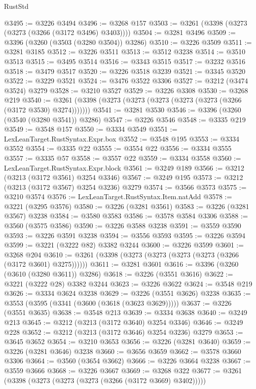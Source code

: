 \begin{lexlean}{RustStd}
\begin{coremodule}
@3495 := @3226 @3494
@3496 := @3268 @157
@3503 := @3261 (@3398 (@3273 (@3273 (@3266 (@3172 @3496) @3403))))
@3504 := @3281 @3496
@3509 := @3396 (@3260 (@3503 (@3280 @3504)) @3286)
@3510 := @3226 @3509
@3511 := @3281 @3185
@3512 := @3226 @3511
@3513 := @3512 @3238
@3514 := @3510 @3513
@3515 := @3495 @3514
@3516 := @3343 @3515
@3517 := @3232 @3516
@3518 := @3479 @3517
@3520 := @3226 @3518 @3239
@3521 := @3345 @3520
@3522 := @3229 @3521
@3524 := @3476 @3522 @3306
@3527 := @3212 (@3474 @3524) @3279
@3528 := @3210 @3527
@3529 := @3226 @3308
@3530 := @3268 @219
@3540 := @3261 (@3398 (@3273 (@3273 (@3273 (@3273 (@3273 (@3266 (@3172 @3530) @3274)))))))
@3541 := @3281 @3530
@3546 := @3396 (@3260 (@3540 (@3280 @3541)) @3286)
@3547 := @3226 @3546
@3548 := @3335 @219
@3549 := @3548 @157
@3550 := @3334 @3549
@3551 := LexLeanTarget.RustSyntax.Expr.box
@3552 := @3548 @195
@3553 := @3334 @3552
@3554 := @3335 @22
@3555 := @3554 @22
@3556 := @3334 @3555
@3557 := @3335 @57
@3558 := @3557 @22
@3559 := @3334 @3558
@3560 := LexLeanTarget.RustSyntax.Expr.block
@3561 := @3249 @189
@3566 := @3212 (@3213 (@3172 @3561) @3254 @3346)
@3567 := @3249 @195
@3573 := @3212 (@3213 (@3172 @3567) @3254 @3236) @3279
@3574 := @3566 @3573
@3575 := @3210 @3574
@3576 := LexLeanTarget.RustSyntax.Item.natAdd
@3578 := @3221 (@3295 @3576)
@3580 := @3226 (@3281 @3561)
@3583 := @3226 (@3281 @3567) @3238
@3584 := @3580 @3583
@3586 := @3578 @3584 @3306
@3588 := @3560 (@3575 @3586)
@3590 := @3226 @3588 @3238
@3591 := @3559 @3590
@3593 := @3226 @3591 @3238
@3594 := @3556 @3593
@3595 := @3226 @3594
@3599 := @3221 (@3222 @82) @3382 @3244
@3600 := @3226 @3599
@3601 := @3268 @204
@3610 := @3261 (@3398 (@3273 (@3273 (@3273 (@3273 (@3266 (@3172 @3601) @3275))))))
@3611 := @3281 @3601
@3616 := @3396 (@3260 (@3610 (@3280 @3611)) @3286)
@3618 := @3226 (@3551 @3616)
@3622 := @3221 (@3222 @28) @3382 @3244
@3623 := @3226 @3622
@3624 := @3548 @219
@3626 := @3334 @3624 @3238
@3629 := @3226 (@3551 @3626) @3238
@3635 := @3553 (@3595 (@3341 (@3600 (@3618 (@3623 @3629)))))
@3637 := @3226 (@3551 @3635)
@3638 := @3548 @213
@3639 := @3334 @3638
@3640 := @3249 @213
@3645 := @3212 (@3213 (@3172 @3640) @3254 @3346)
@3646 := @3249 @228
@3652 := @3212 (@3213 (@3172 @3646) @3254 @3236) @3279
@3653 := @3645 @3652
@3654 := @3210 @3653
@3656 := @3226 (@3281 @3640)
@3659 := @3226 (@3281 @3646) @3238
@3660 := @3656 @3659
@3662 := @3578 @3660 @3306
@3664 := @3560 (@3654 @3662)
@3666 := @3226 @3664 @3238
@3667 := @3559 @3666
@3668 := @3226 @3667
@3669 := @3268 @322
@3677 := @3261 (@3398 (@3273 (@3273 (@3273 (@3266 (@3172 @3669) @3402)))))

\end{coremodule}
\end{lexlean}
